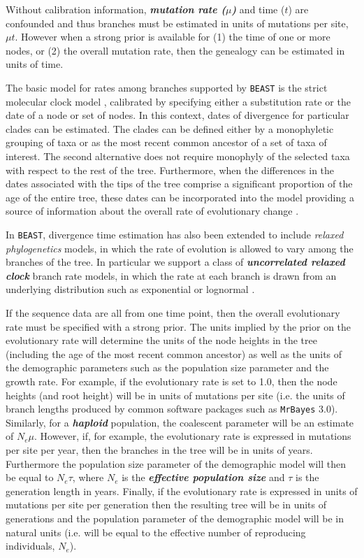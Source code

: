 \documentclass[cup7b, english]{cupbook}
\begin{document}
Without calibration information, \textbf{\textit{mutation rate ($\mu$)}}
and time ($t$) are confounded and thus branches must be estimated in units
of mutations per site, $\mu t$. However when a strong prior is available for (1) the time
of one or more nodes, or (2) the overall mutation rate, then the genealogy can be estimated
in units of time.

The basic model for rates among branches supported by \texttt{BEAST} is the
strict molecular clock model \cite{ZP1965}, calibrated by specifying
either a substitution rate or the date of a node or set of nodes.
In this context, dates of divergence for particular clades can be
estimated. The clades can be defined either by a monophyletic grouping
of taxa or as the most recent common ancestor of a set of taxa of
interest. The second alternative does not require monophyly of the
selected taxa with respect to the rest of the tree. Furthermore, when
the differences in the dates associated with the tips of the tree
comprise a significant proportion of the age of the entire tree, these
dates can be incorporated into the model providing a source of information
about the overall rate of evolutionary change \cite{DNRS2002,DPRFR2003}.

In \texttt{BEAST}, divergence time estimation has also been extended to include
\emph{relaxed phylogenetics} models, in which the rate of evolution
is allowed to vary among the branches of the tree. In particular we
support a class of \textbf{\textit{uncorrelated relaxed clock}} branch rate models,
in which the rate at each branch is drawn from an underlying distribution
such as exponential or lognormal \cite{DHPR2006}.

If the sequence data are all from one time point, then the overall
evolutionary rate must be specified with a strong prior. The units
implied by the prior on the evolutionary rate will determine the units
of the node heights in the tree (including the age of the most recent
common ancestor) as well as the units of the demographic parameters
such as the population size parameter and the growth rate. For example,
if the evolutionary rate is set to 1.0, then the node heights (and
root height) will be in units of mutations per site (i.e. the units
of branch lengths produced by common software packages such as \texttt{MrBayes}
3.0). Similarly, for a \textbf{\textit{haploid}} population, the coalescent parameter
will be an estimate of $N_{e}\mu$. However, if, for example, the
evolutionary rate is expressed in mutations per site per year, then
the branches in the tree will be in units of years. Furthermore the
population size parameter of the demographic model will then be equal
to $N_{e}\tau$, where $N_{e}$ is the \textbf{\textit{effective population size}} and
$\tau$ is the generation length in years. Finally, if the evolutionary
rate is expressed in units of mutations per site per generation then
the resulting tree will be in units of generations and the population
parameter of the demographic model will be in natural units (i.e.
will be equal to the effective number of reproducing individuals,
$N_{e}$).
\end{document}
